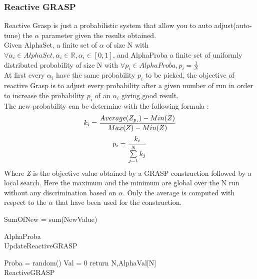 \documentclass[12pt]{article}
\begin{document}
	\subsubsection{Reactive GRASP}
	Reactive Grasp is just a probabilistic system that allow you to auto adjust(auto-tune) the $\alpha$ parameter given the results obtained.\\
	Given AlphaSet, a finite set of $\alpha$ of size N with $\forall \alpha_i \in AlphaSet ,\alpha_i \in \mathbb{R} , \alpha_i \in [0,1]$, and AlphaProba a finite set of uniformly distributed probability of size N with $\forall p_i \in AlphaProba, p_i = \frac{1}{N}$\\
	At first every $\alpha_i$ have the same probability $p_i$ to be picked, the objective of reactive Grasp is to adjust every probability after a given number of run in order to increase the probability $p_i$ of an $\alpha_i$ giving good result.\\
	The new probability can be determine with the following formula :\\
	$$
			k_i = \frac{Average(Z_{p_i})-Min(Z)}{Max(Z)-Min(Z)}\\
	$$
	$$
			p_i = \frac{k_i}{\sum\limits_{j=1}^N k_j}\\
	$$
	Where \textit{Z} is the objective value obtained by a GRASP construction followed by a local search. Here the maximum and the minimum are global over the N run without any discrimination based on $\alpha$. Only the average is computed with respect to the $\alpha$ that have been used for the construction.\\
	\begin{algorithm}[H]

		SumOfNew = sum(NewValue)	
		
		\Return AlphaProba\\
		
		\caption{UpdateReactiveGRASP}
	\end{algorithm}
	\begin{algorithm}[H]
		Proba = random()
		Val = 0
		return N,AlphaVal[N]\\
		
		\caption{ReactiveGRASP}
	\end{algorithm}
\end{document}
